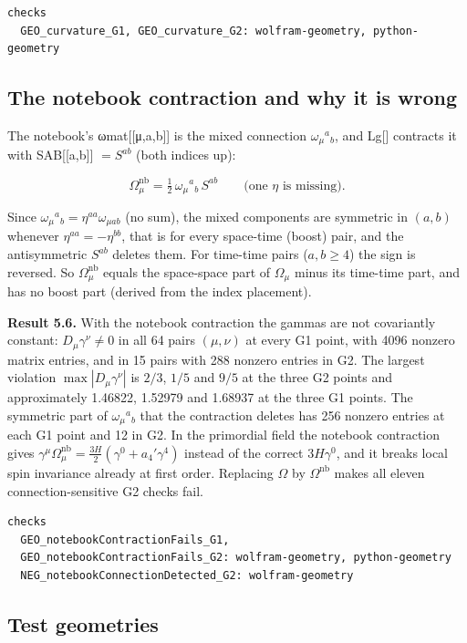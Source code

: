 \documentclass[11pt]{article}
\begin{document}
\begin{Verbatim}[fontsize=\small]
checks
  GEO_curvature_G1, GEO_curvature_G2: wolfram-geometry, python-geometry
\end{Verbatim}

\subsection{The notebook contraction and why it is wrong}

The notebook's ωmat[[μ,a,b]] is the mixed connection $\omega_\mu{}^a{}_b$, and Lg[] contracts it with SAB[[a,b]] $=S^{ab}$ (both indices up):

\[
\Omega^{\mathrm{nb}}_\mu=\tfrac12\,\omega_\mu{}^a{}_b\,S^{ab}\qquad\text{(one }\eta\text{ is missing).}
\]

Since $\omega_\mu{}^a{}_b=\eta^{aa}\omega_{\mu ab}$ (no sum), the mixed components are symmetric in $(a,b)$ whenever $\eta^{aa}=-\eta^{bb}$, that is for every space-time (boost) pair, and the antisymmetric $S^{ab}$ deletes them. For time-time pairs ($a,b\ge4$) the sign is reversed. So $\Omega^{\mathrm{nb}}_\mu$ equals the space-space part of $\Omega_\mu$ minus its time-time part, and has no boost part (derived from the index placement).

\textbf{Result 5.6.} With the notebook contraction the gammas are not covariantly constant: $D_\mu\gamma^\nu\ne0$ in all 64 pairs $(\mu,\nu)$ at every G1 point, with 4096 nonzero matrix entries, and in 15 pairs with 288 nonzero entries in G2. The largest violation $\max|D_\mu\gamma^\nu|$ is $2/3$, $1/5$ and $9/5$ at the three G2 points and approximately 1.46822, 1.52979 and 1.68937 at the three G1 points. The symmetric part of $\omega_\mu{}^a{}_b$ that the contraction deletes has 256 nonzero entries at each G1 point and 12 in G2. In the primordial field the notebook contraction gives $\gamma^\mu\Omega^{\mathrm{nb}}_\mu=\tfrac{3H}2(\gamma^0+a_4'\gamma^4)$ instead of the correct $3H\gamma^0$, and it breaks local spin invariance already at first order. Replacing $\Omega$ by $\Omega^{\mathrm{nb}}$ makes all eleven connection-sensitive G2 checks fail.

\begin{Verbatim}[fontsize=\small]
checks
  GEO_notebookContractionFails_G1,
  GEO_notebookContractionFails_G2: wolfram-geometry, python-geometry
  NEG_notebookConnectionDetected_G2: wolfram-geometry
\end{Verbatim}

\subsection{Test geometries}
\end{document}
